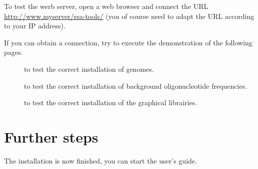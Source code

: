 \documentclass{article}
\begin{document}
To test the werb server, open a web browser and connect the URL
\url{http://www.myserver/rsa-tools/} (you of course need to adapt the
 URL according to your IP address).

If you can obtain a connection, try to execute the demonstration of
the following pages.

\begin{description}
\item[] to test the correct installation of genomes. 

\item[] to test the correct installation of
background oligonucleotide frequencies.

\item[] to test the correct installation of the
graphical librairies.

\end{description}

\section{Further steps}

The installation is now finished, you can start the user's guide. 
\end{document}
